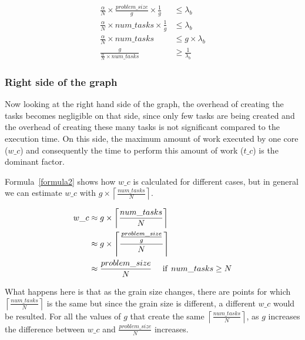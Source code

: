\begin{equation}\label{formula5}
\begin{aligned}
\frac{\alpha}{N}\times{\frac{problem\_{size}}{g}}\times{\frac{1}{g}}&\leq{\lambda_b}\\
\frac{\alpha}{N}\times{num\_{tasks}}\times{\frac{1}{g}}&\leq{\lambda_b}\\
\frac{\alpha}{N}\times{num\_{tasks}}&\leq{g\times\lambda_b}\\	
\frac{g}{\frac{\alpha}{N}\times{num\_{tasks}}}&\geq{\frac{1}{\lambda_b}}
\end{aligned}
\end{equation}


\subsubsection{Right side of the graph}
Now looking at the right hand side of the graph, the overhead of creating the tasks becomes negligible on that side, since only few tasks are being created and the overhead of creating these many tasks is not significant compared to the execution time. On this side, the maximum amount of work executed by one core ($w\_c$) and consequently the time to perform this amount of work ($t\_c$) is the dominant factor.

Formula~\ref{formula2} shows how $w\_c$ is calculated for different cases, but in general we can estimate $w\_c$ with $g\times\left \lceil{\frac{num\_{tasks}}{N}}\right \rceil$. 

\begin{equation}\label{formula6}
\begin{aligned}
w\_c&\approx{g\times\left \lceil{\frac{num\_{tasks}}{N}}\right \rceil}\\
&\approx{g\times\left \lceil{\frac{\frac{problem\_{size}}{g}}{N}}\right \rceil}\\
&\approx{\frac{problem\_{size}}{N}} \:\:\text{\:\:\:\:if\:\:} num\_{tasks}\geq{N}
\end{aligned}
\end{equation}

What happens here is that as the grain size changes, there are points for which $\left \lceil{\frac{num\_{tasks}}{N}}\right \rceil$ is the same but since the grain size is different, a different $w\_c$ would be resulted. 
For all the values of $g$ that create the same $\left \lceil{\frac{num\_{tasks}}{N}}\right \rceil$, as $g$ increases the difference between $w\_c$ and $\frac{problem\_{size}}{N}$ increases. 

